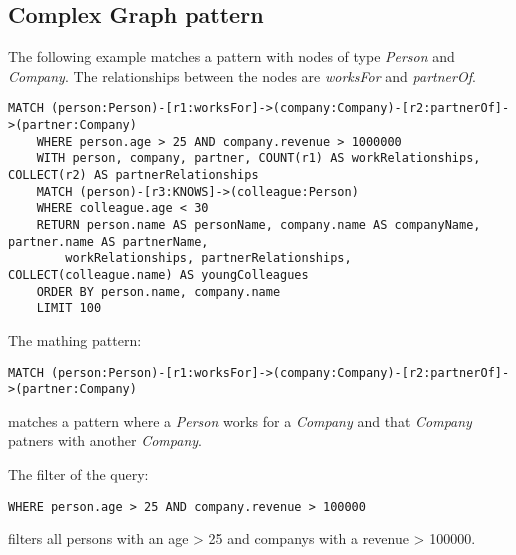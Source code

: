 \subsection{Complex Graph pattern}
The following example matches a pattern
with nodes of type \textit{Person} and \textit{Company}.
The relationships between the nodes are \textit{worksFor} and \textit{partnerOf}.

\begin{lstlisting}[caption={Example for a complex quantified graph pattern (Benchmark)}, label={lst:benchmark}]
    MATCH (person:Person)-[r1:worksFor]->(company:Company)-[r2:partnerOf]->(partner:Company)
	WHERE person.age > 25 AND company.revenue > 1000000
	WITH person, company, partner, COUNT(r1) AS workRelationships, COLLECT(r2) AS partnerRelationships
	MATCH (person)-[r3:KNOWS]->(colleague:Person)
	WHERE colleague.age < 30
	RETURN person.name AS personName, company.name AS companyName, partner.name AS partnerName, 
		workRelationships, partnerRelationships, COLLECT(colleague.name) AS youngColleagues
	ORDER BY person.name, company.name
	LIMIT 100
\end{lstlisting}

The mathing pattern:
\begin{lstlisting}[caption={Matching pattern of complex quantified graph query}, label={lst:matchOfComplexGraph}]
    MATCH (person:Person)-[r1:worksFor]->(company:Company)-[r2:partnerOf]->(partner:Company)
\end{lstlisting}
matches a pattern where a \textit{Person} works for a \textit{Company} and that 
\textit{Company} patners with another \textit{Company}.

The filter of the query:
\begin{lstlisting}[caption={Filter of complex quantified graph query}, label={lst:filterOfComplexGraph}]
	WHERE person.age > 25 AND company.revenue > 100000
\end{lstlisting}
filters all persons with an age > 25 and companys with a revenue > 100000.

